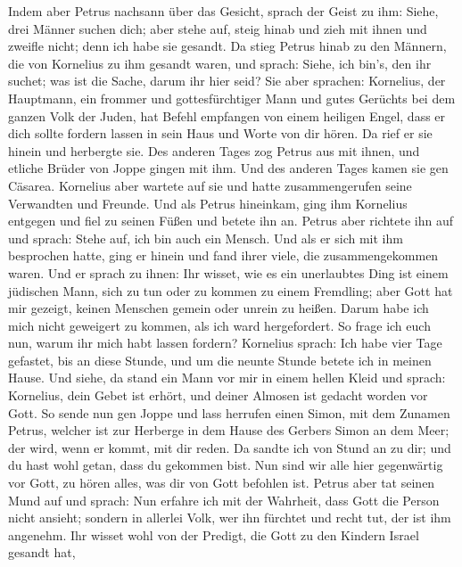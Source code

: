 Indem aber Petrus nachsann über das Gesicht, sprach der Geist zu ihm:
Siehe, drei Männer suchen dich;  aber stehe auf, steig
hinab und zieh mit ihnen und zweifle nicht; denn ich habe sie gesandt.
 Da stieg Petrus hinab zu den Männern, die von Kornelius zu
ihm gesandt waren, und sprach: Siehe, ich bin's, den ihr suchet; was ist
die Sache, darum ihr hier seid?  Sie aber sprachen:
Kornelius, der Hauptmann, ein frommer und gottesfürchtiger Mann und
gutes Gerüchts bei dem ganzen Volk der Juden, hat Befehl empfangen von
einem heiligen Engel, dass er dich sollte fordern lassen in sein Haus
und Worte von dir hören.  Da rief er sie hinein und
herbergte sie. Des anderen Tages zog Petrus aus mit ihnen, und etliche
Brüder von Joppe gingen mit ihm.  Und des anderen Tages
kamen sie gen Cäsarea. Kornelius aber wartete auf sie und hatte
zusammengerufen seine Verwandten und Freunde.  Und als
Petrus hineinkam, ging ihm Kornelius entgegen und fiel zu seinen Füßen
und betete ihn an.  Petrus aber richtete ihn auf und
sprach: Stehe auf, ich bin auch ein Mensch.  Und als er
sich mit ihm besprochen hatte, ging er hinein und fand ihrer viele, die
zusammengekommen waren.  Und er sprach zu ihnen: Ihr
wisset, wie es ein unerlaubtes Ding ist einem jüdischen Mann, sich zu
tun oder zu kommen zu einem Fremdling; aber Gott hat mir gezeigt, keinen
Menschen gemein oder unrein zu heißen.  Darum habe ich mich
nicht geweigert zu kommen, als ich ward hergefordert. So frage ich euch
nun, warum ihr mich habt lassen fordern?  Kornelius sprach:
Ich habe vier Tage gefastet, bis an diese Stunde, und um die neunte
Stunde betete ich in meinen Hause. Und siehe, da stand ein Mann vor mir
in einem hellen Kleid  und sprach: Kornelius, dein Gebet
ist erhört, und deiner Almosen ist gedacht worden vor Gott.
 So sende nun gen Joppe und lass herrufen einen Simon, mit
dem Zunamen Petrus, welcher ist zur Herberge in dem Hause des Gerbers
Simon an dem Meer; der wird, wenn er kommt, mit dir reden. 
Da sandte ich von Stund an zu dir; und du hast wohl getan, dass du
gekommen bist. Nun sind wir alle hier gegenwärtig vor Gott, zu hören
alles, was dir von Gott befohlen ist.  Petrus aber tat
seinen Mund auf und sprach: Nun erfahre ich mit der Wahrheit, dass Gott
die Person nicht ansieht;  sondern in allerlei Volk, wer
ihn fürchtet und recht tut, der ist ihm angenehm.  Ihr
wisset wohl von der Predigt, die Gott zu den Kindern Israel gesandt hat,
